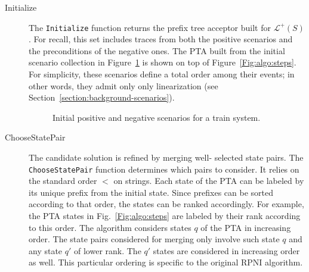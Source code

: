 \begin{description}

\item[Initialize] The \texttt{Initialize} function returns the prefix tree acceptor built for $\mathcal{L}^+(S)$. For recall, this set includes traces from both the positive scenarios and the preconditions of the negative ones. The PTA built from the initial scenario collection in Figure~\ref{Fig:init:scen} is shown on top of Figure~\ref{Fig:algo:steps}. For simplicity, these scenarios define a total order among their events; in other words, they admit only only linearization (see Section~\ref{section:background-scenarios}). 

\begin{figure}
\centering
{}
\caption{Initial positive and negative scenarios for a train system\label{Fig:init:scen}.}
\end{figure}

\item[ChooseStatePair] The candidate solution is refined by merging well- selected state pairs. The \texttt{ChooseStatePair} function determines which pairs to consider. It relies on the standard order $<$ on strings. Each state of the PTA can be labeled by its unique prefix from the initial state. Since prefixes can be sorted according to that order, the states can be ranked accordingly. For example, the PTA states in Fig.~\ref{Fig:algo:steps} are labeled by their rank according to this order. The algorithm considers states $q$ of the PTA in increasing order. The state pairs considered for merging only involve such state $q$ and any state $q'$ of lower rank. The $q'$ states are considered in increasing order as well. This particular ordering is specific to the original RPNI algorithm.


\end{description}
